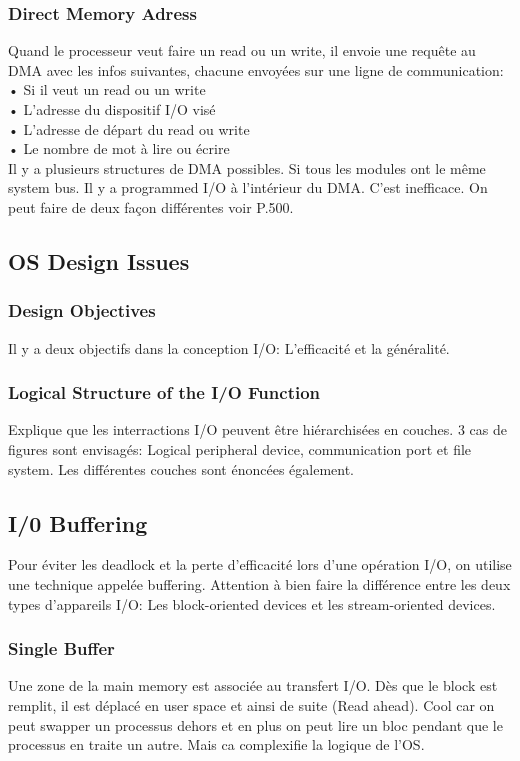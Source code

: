 \subsubsection{Direct Memory Adress}
Quand le processeur veut faire un read ou un write, il envoie une requête au DMA avec les infos suivantes, chacune envoyées sur une ligne de communication: \\
• Si il veut un read ou un write \\
• L’adresse du dispositif I/O visé \\
• L’adresse de départ du read ou write \\
• Le nombre de mot à lire ou écrire \\
Il y a plusieurs structures de DMA possibles. Si tous les modules ont le même system bus. Il y a programmed I/O à l’intérieur du DMA. C’est inefficace. On peut faire de deux façon différentes voir P.500.

\subsection{OS Design Issues}

\subsubsection{Design Objectives}
Il y a deux objectifs dans la conception I/O: L’efficacité et la généralité.

\subsubsection{Logical Structure of the I/O Function}
Explique que les interractions I/O peuvent être hiérarchisées en couches. 3 cas de figures sont envisagés: Logical peripheral device, communication port et file system. Les différentes couches sont énoncées également.


\subsection{I/0 Buffering}
Pour éviter les deadlock et la perte d’efficacité lors d’une opération I/O, on utilise une technique appelée buffering. Attention à bien faire la différence entre les deux types d’appareils I/O: Les block-oriented devices et les stream-oriented devices.

\subsubsection{Single Buffer}
Une zone de la main memory est associée au transfert I/O. Dès que le block est remplit, il est déplacé en user space et ainsi de suite (Read ahead). Cool car on peut swapper un processus dehors et en plus on peut lire un bloc pendant que le processus en traite un autre. Mais ca complexifie la logique de l’OS.

